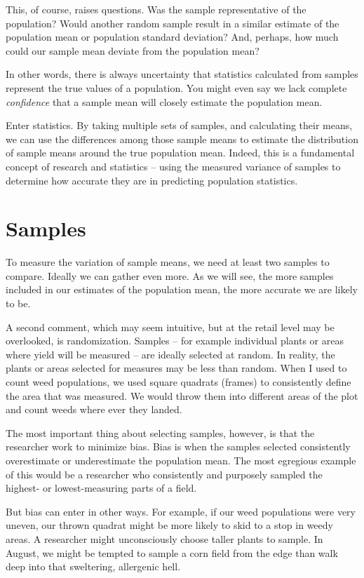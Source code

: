 \documentclass[
]{book}
\begin{document}
This, of course, raises questions. Was the sample representative of the
population? Would another random sample result in a similar estimate of
the population mean or population standard deviation? And, perhaps, how
much could our sample mean deviate from the population mean?

In other words, there is always uncertainty that statistics calculated
from samples represent the true values of a population. You might even
say we lack complete \emph{confidence} that a sample mean will closely
estimate the population mean.

Enter statistics. By taking multiple sets of samples, and calculating
their means, we can use the differences among those sample means to
estimate the distribution of sample means around the true population
mean. Indeed, this is a fundamental concept of research and statistics
-- using the measured variance of samples to determine how accurate they
are in predicting population statistics.

\hypertarget{samples}{%
\section{Samples}\label{samples}}

To measure the variation of sample means, we need at least two samples
to compare. Ideally we can gather even more. As we will see, the more
samples included in our estimates of the population mean, the more
accurate we are likely to be.

A second comment, which may seem intuitive, but at the retail level may
be overlooked, is randomization. Samples -- for example individual
plants or areas where yield will be measured -- are ideally selected at
random. In reality, the plants or areas selected for measures may be
less than random. When I used to count weed populations, we used square
quadrats (frames) to consistently define the area that was measured. We
would throw them into different areas of the plot and count weeds where
ever they landed.

The most important thing about selecting samples, however, is that the
researcher work to minimize bias. Bias is when the samples selected
consistently overestimate or underestimate the population mean. The most
egregious example of this would be a researcher who consistently and
purposely sampled the highest- or lowest-measuring parts of a field.

But bias can enter in other ways. For example, if our weed populations
were very uneven, our thrown quadrat might be more likely to skid to a
stop in weedy areas. A researcher might unconsciously choose taller
plants to sample. In August, we might be tempted to sample a corn field
from the edge than walk deep into that sweltering, allergenic hell.
\end{document}
